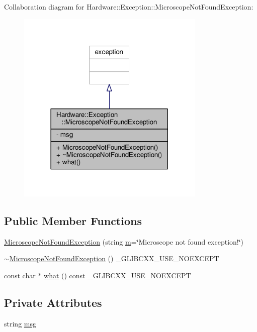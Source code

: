 Collaboration diagram for Hardware\+:\+:Exception\+:\+:Microscope\+Not\+Found\+Exception\+:\nopagebreak
\begin{figure}[H]
\begin{center}
\leavevmode
\includegraphics[width=254pt]{class_hardware_1_1_exception_1_1_microscope_not_found_exception__coll__graph}
\end{center}
\end{figure}
\subsection*{Public Member Functions}
\begin{DoxyCompactItemize}
\item 
\hyperlink{class_hardware_1_1_exception_1_1_microscope_not_found_exception_aa88d0a06f52fe844cb05a215c16280e1}{Microscope\+Not\+Found\+Exception} (string \hyperlink{_gen_blob_8m_ab3cd915d758008bd19d0f2428fbb354a}{m}=\char`\"{}Microscope not found exception!\char`\"{})
\item 
\hyperlink{class_hardware_1_1_exception_1_1_microscope_not_found_exception_ac0e28534b6ce97fc4b7a6daed1586aa4}{$\sim$\+Microscope\+Not\+Found\+Exception} () \+\_\+\+G\+L\+I\+B\+C\+X\+X\+\_\+\+U\+S\+E\+\_\+\+N\+O\+E\+X\+C\+E\+P\+T
\item 
const char $\ast$ \hyperlink{class_hardware_1_1_exception_1_1_microscope_not_found_exception_a857d46cbf05bffd59c33b05bdc838426}{what} () const \+\_\+\+G\+L\+I\+B\+C\+X\+X\+\_\+\+U\+S\+E\+\_\+\+N\+O\+E\+X\+C\+E\+P\+T
\end{DoxyCompactItemize}
\subsection*{Private Attributes}
\begin{DoxyCompactItemize}
\item 
string \hyperlink{class_hardware_1_1_exception_1_1_microscope_not_found_exception_ae8ac712f31fe28bba8946710521e8926}{msg}
\end{DoxyCompactItemize}


